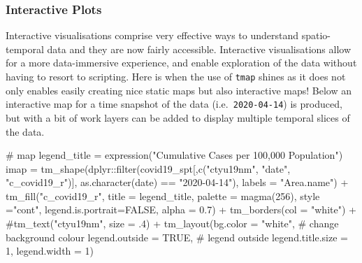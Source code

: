 \documentclass[
  letterpaper,
  DIV=11,
  numbers=noendperiod,
  oneside]{scrreprt}
\newenvironment{Shaded}{\begin{snugshade}}{\end{snugshade}}
\newcommand{\AttributeTok}[1]{\textcolor[rgb]{0.40,0.45,0.13}{#1}}
\newcommand{\CommentTok}[1]{\textcolor[rgb]{0.37,0.37,0.37}{#1}}
\newcommand{\ConstantTok}[1]{\textcolor[rgb]{0.56,0.35,0.01}{#1}}
\newcommand{\DecValTok}[1]{\textcolor[rgb]{0.68,0.00,0.00}{#1}}
\newcommand{\FloatTok}[1]{\textcolor[rgb]{0.68,0.00,0.00}{#1}}
\newcommand{\FunctionTok}[1]{\textcolor[rgb]{0.28,0.35,0.67}{#1}}
\newcommand{\NormalTok}[1]{\textcolor[rgb]{0.00,0.23,0.31}{#1}}
\newcommand{\OtherTok}[1]{\textcolor[rgb]{0.00,0.23,0.31}{#1}}
\newcommand{\SpecialCharTok}[1]{\textcolor[rgb]{0.37,0.37,0.37}{#1}}
\newcommand{\StringTok}[1]{\textcolor[rgb]{0.13,0.47,0.30}{#1}}
\begin{document}
\subsubsection{Interactive Plots}\label{interactive-plots}

Interactive visualisations comprise very effective ways to understand
spatio-temporal data and they are now fairly accessible. Interactive
visualisations allow for a more data-immersive experience, and enable
exploration of the data without having to resort to scripting. Here is
when the use of \texttt{tmap} shines as it does not only enables easily
creating nice static maps but also interactive maps! Below an
interactive map for a time snapshot of the data
(i.e.~\texttt{2020-04-14}) is produced, but with a bit of work layers
can be added to display multiple temporal slices of the data.

\begin{Shaded}
\begin{Highlighting}[]
\CommentTok{\# map}
\NormalTok{legend\_title }\OtherTok{=} \FunctionTok{expression}\NormalTok{(}\StringTok{"Cumulative Cases per 100,000 Population"}\NormalTok{)}
\NormalTok{imap }\OtherTok{=} \FunctionTok{tm\_shape}\NormalTok{(dplyr}\SpecialCharTok{::}\FunctionTok{filter}\NormalTok{(covid19\_spt[,}\FunctionTok{c}\NormalTok{(}\StringTok{"ctyu19nm"}\NormalTok{, }\StringTok{"date"}\NormalTok{, }\StringTok{"c\_covid19\_r"}\NormalTok{)], }\FunctionTok{as.character}\NormalTok{(date) }\SpecialCharTok{==} \StringTok{"2020{-}04{-}14"}\NormalTok{), }\AttributeTok{labels =} \StringTok{"Area.name"}\NormalTok{) }\SpecialCharTok{+}
  \FunctionTok{tm\_fill}\NormalTok{(}\StringTok{"c\_covid19\_r"}\NormalTok{, }\AttributeTok{title =}\NormalTok{ legend\_title, }\AttributeTok{palette =} \FunctionTok{magma}\NormalTok{(}\DecValTok{256}\NormalTok{), }\AttributeTok{style =}\StringTok{"cont"}\NormalTok{, }\AttributeTok{legend.is.portrait=}\ConstantTok{FALSE}\NormalTok{, }\AttributeTok{alpha =} \FloatTok{0.7}\NormalTok{) }\SpecialCharTok{+}
  \FunctionTok{tm\_borders}\NormalTok{(}\AttributeTok{col =} \StringTok{"white"}\NormalTok{) }\SpecialCharTok{+}
  \CommentTok{\#tm\_text("ctyu19nm", size = .4) +}
  \FunctionTok{tm\_layout}\NormalTok{(}\AttributeTok{bg.color =} \StringTok{"white"}\NormalTok{, }\CommentTok{\# change background colour}
            \AttributeTok{legend.outside =} \ConstantTok{TRUE}\NormalTok{, }\CommentTok{\# legend outside}
            \AttributeTok{legend.title.size =} \DecValTok{1}\NormalTok{,}
            \AttributeTok{legend.width =} \DecValTok{1}\NormalTok{) }
\end{Highlighting}
\end{Shaded}
\end{document}
